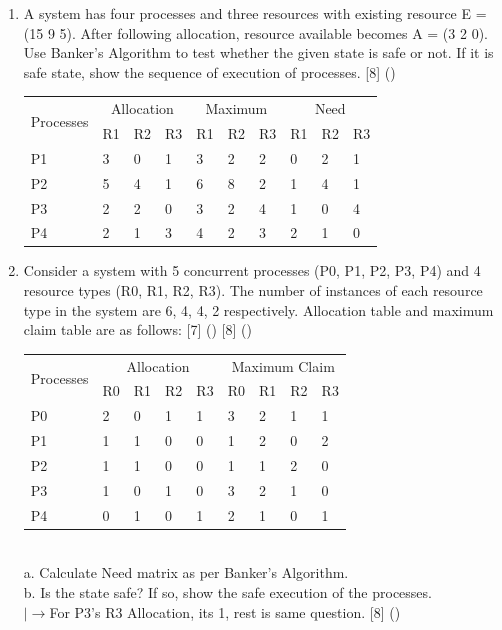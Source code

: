 \documentclass[12pt]{article}
\newcommand{\lb}{\\$\left|\rightarrow\right.$}
\begin{document}
\begin{enumerate}
			\item A system has four processes and three resources with existing resource E = (15 9 5). After following allocation, resource available becomes A = (3 2 0). Use Banker's Algorithm to test whether the given state is safe or not. If it is safe state, show the sequence of execution of processes. \hfill [8] ()
			\begin{tabular}{|p{17mm}|p{7mm}|p{7mm}|p{7mm}|p{7mm}|p{7mm}|p{7mm}|p{7mm}|p{7mm}|p{7mm}|}
				\hline
				\multirow{2}{*}{Processes} & \multicolumn{3}{|c|}{Allocation} & \multicolumn{3}{|c|}{Maximum} & \multicolumn{3}{|c|}{Need} \\ \cline{2-10}
				& R1 & R2 & R3 & R1 & R2 & R3 & R1 & R2 & R3 \\ \hline
				P1 & 3 & 0 & 1 & 3 & 2 & 2 & 0 & 2 & 1 \\ \hline
				P2 & 5 & 4 & 1 & 6 & 8 & 2 & 1 & 4 & 1 \\ \hline
				P3 & 2 & 2 & 0 & 3 & 2 & 4 & 1 & 0 & 4 \\ \hline
				P4 & 2 & 1 & 3 & 4 & 2 & 3 & 2 & 1 & 0 \\ \hline
			\end{tabular}

			\item Consider a system with 5 concurrent processes (P0, P1, P2, P3, P4) and 4 resource types (R0, R1, R2, R3). The number of instances of each resource type in the system are 6, 4, 4, 2 respectively. Allocation table and maximum claim table are as follows: \hfill [7] () [8] (\bo{\texttt{80 Bh}, 76 Bh})
			\begin{tabular}{|p{17mm}|p{7mm}|p{7mm}|p{7mm}|p{7mm}||p{7mm}|p{7mm}|p{7mm}|p{7mm}|}
				\hline
				\multirow{2}{*}{Processes} & \multicolumn{4}{|c||}{Allocation} & \multicolumn{4}{|c|}{Maximum Claim} \\ \cline{2-7}
				& R0 & R1 & R2 & R3 & R0 & R1 & R2 & R3 \\ \hline
				P0 & 2 & 0 & 1 & 1 & 3 & 2 & 1 & 1 \\ \hline
				P1 & 1 & 1 & 0 & 0 & 1 & 2 & 0 & 2 \\ \hline
				P2 & 1 & 1 & 0 & 0 & 1 & 1 & 2 & 0 \\ \hline
				P3 & 1 & 0 & 1 & 0 & 3 & 2 & 1 & 0 \\ \hline
				P4 & 0 & 1 & 0 & 1 & 2 & 1 & 0 & 1 \\ \hline
			\end{tabular}\\
			a. Calculate Need matrix as per Banker's Algorithm.\\
			b. Is the state safe? If so, show the safe execution of the processes.
			\lb For P3's R3 Allocation, its 1, rest is same question. \hfill [8] ()


\end{enumerate}
\end{document}
